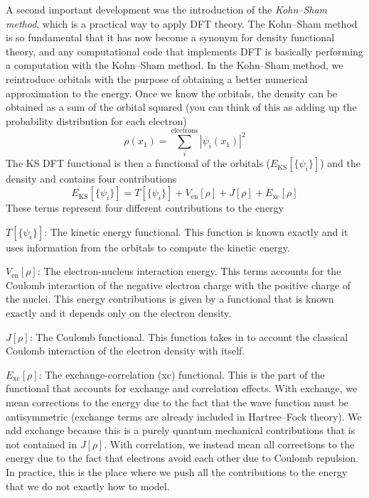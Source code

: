 \documentclass[../Main/chem371-notes.tex]{subfiles}
\begin{document}
A second important development was the introduction of the \emph{Kohn--Sham method}, which is a practical way to apply DFT theory.
The Kohn--Sham method is so fundamental that it has now become a synonym for density functional theory, and any computational code that implements DFT is basically performing a computation with the Kohn--Sham method.
In the Kohn--Sham method, we reintroduce orbitals with the purpose of obtaining a better numerical approximation to the energy.
Once we know the orbitals, the density can be obtained as a sum of the orbital squared (you can think of this as adding up the probability distribution for each electron)
\begin{equation}
\rho(x_1) = \sum_i^{\mathrm{electrons}} |\psi_i(x_1)|^2
\end{equation}
The KS DFT functional is then a functional of the orbitals ($E_\mathrm{KS} [\{\psi_i\}]$) and the density and contains four contributions
\begin{equation}
\label{eq:dft:ksenergy}
E_\mathrm{KS} [\{\psi_i\}] = T[\{\psi_i\}] + V_\mathrm{en}[\rho] + J[\rho] + E_\mathrm{xc}[\rho]
\end{equation}
These terms represent four different contributions to the energy
\begin{myitems}
\item $T[\{\psi_i\}]$: The kinetic energy functional. This function is known exactly and it uses information from the orbitals to compute the kinetic energy.
\item $V_\mathrm{en}[\rho]$: The electron-nucleus interaction energy. This terms accounts for the Coulomb interaction of the negative electron charge with the positive charge of the nuclei. This energy contributions is given by a functional that is known exactly and it depends only on the electron density.
\item $J[\rho]$: The Coulomb functional. This function takes in to account the classical Coulomb interaction of the electron density with itself.
\item $E_\mathrm{xc}[\rho]$: The exchange-correlation (xc) functional. This is the part of the functional that accounts for exchange and correlation effects. With exchange, we mean corrections to the energy due to the fact that the wave function must be antisymmetric (exchange terms are already included in Hartree--Fock theory). We add exchange because this is a purely quantum mechanical contributions that is not contained in $J[\rho]$.
With correlation, we instead mean all corrections to the energy due to the fact that electrons avoid each other due to Coulomb repulsion. In practice, this is the place where we push all the contributions to the energy that we do not exactly how to model.
\end{myitems}
\end{document}

